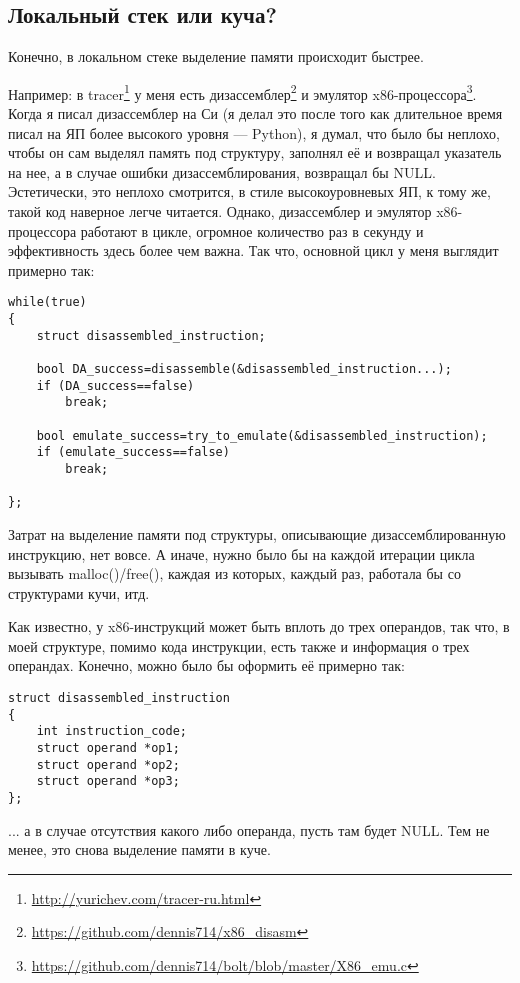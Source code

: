 ﻿\subsection{Локальный стек или куча?}

Конечно, в локальном стеке выделение памяти происходит быстрее.

Например: в tracer\footnote{\url{http://yurichev.com/tracer-ru.html}} у меня есть дизассемблер\footnote{\url{https://github.com/dennis714/x86_disasm}} 
и эмулятор x86-процессора\footnote{\url{https://github.com/dennis714/bolt/blob/master/X86_emu.c}}.
Когда я писал дизассемблер на Си (я делал это после того как длительное время писал на ЯП 
более высокого уровня --- Python), 
я думал, что было бы неплохо, чтобы он сам выделял память под структуру, заполнял её
и возвращал указатель на нее, а в случае ошибки дизассемблирования, возвращал бы NULL. Эстетически, это 
неплохо смотрится, в стиле высокоуровневых ЯП, к тому же, такой код наверное легче читается. 
Однако, дизассемблер и эмулятор x86-процессора
работают в цикле, огромное количество раз в секунду и эффективность здесь более чем важна.
Так что, основной цикл у меня выглядит примерно так:

\begin{lstlisting}
while(true)
{
	struct disassembled_instruction;

	bool DA_success=disassemble(&disassembled_instruction...);
	if (DA_success==false)
		break;

	bool emulate_success=try_to_emulate(&disassembled_instruction);
	if (emulate_success==false)
		break;

};
\end{lstlisting}

Затрат на выделение памяти под структуры, описывающие дизассемблированную инструкцию, нет вовсе.
А иначе, нужно было бы на каждой итерации цикла вызывать malloc()/free(), каждая из которых, каждый раз,
работала бы со структурами кучи, итд.

Как известно, у x86-инструкций может быть вплоть до трех операндов, так что, в моей структуре, помимо
кода инструкции, есть также и информация о трех операндах. Конечно, можно было бы оформить её примерно так:

\begin{lstlisting}
struct disassembled_instruction
{
	int instruction_code;
	struct operand *op1;
	struct operand *op2;
	struct operand *op3;
};
\end{lstlisting}

... а в случае отсутствия какого либо операнда, пусть там будет NULL. Тем не менее, это снова выделение памяти в куче.


